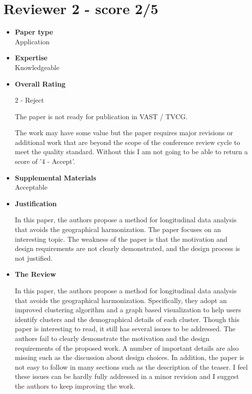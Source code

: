 \documentclass{article}
\begin{document}
\section{Reviewer 2 - score 2/5}
\begin{itemize}

\item{\textbf{Paper type}\\Application}

\item{\textbf{Expertise}\\Knowledgeable}

\item{\textbf{Overall Rating}

    2 - Reject
    
    The paper is not ready for publication in VAST / TVCG.
    
    The work may have some value but the paper requires major revisions or
    additional work that are beyond the scope of the conference review cycle to meet
    the quality standard. Without this I am not going to be able to return a score of
    '4 - Accept'.}

\item{\textbf{Supplemental Materials}\\Acceptable}

\item{\textbf{Justification}

    In this paper, the authors propose a method for longitudinal data analysis that
    avoids the geographical harmonization. The paper focuses on an interesting topic.
    The weakness of the paper is that the motivation and design requirements are not
    clearly demonstrated, and the design process is not justified.}

\item{\textbf{The Review}

    In this paper, the authors propose a method for longitudinal data analysis that
    avoids the geographical harmonization. Specifically, they adopt an improved
    clustering algorithm and a graph based visualization to help users identify
    clusters and the demographical details of each cluster. Though this paper is
    interesting to read, it still has several issues to be addressed. The authors fail
    to clearly demonstrate the motivation and the design requirements of the proposed
    work. A number of important details are also missing such as the discussion about
    design choices. In addition, the paper is not easy to follow in many sections such
    as the description of the teaser. I feel these issues can be hardly fully
    addressed in a minor revision and I suggest the authors to keep improving the
    work.

}
\end{itemize}
\end{document}

